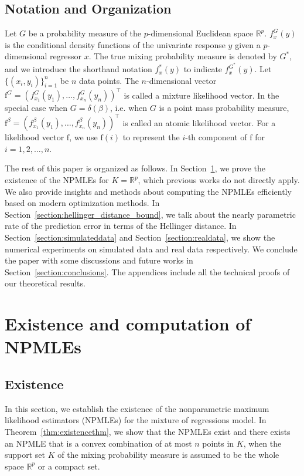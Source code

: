 \documentclass[11pt]{article}
\numberwithin{equation}{section}
\newcommand{\RS}{\mathbb{R}}
\newcommand{\T}{ \top }
\newcommand{\fv}{\mathrm{f}}
\begin{document}
\subsection{Notation and Organization}

 Let $G$ be a probability measure of the $p$-dimensional Euclidean space $\RS^p$. $f^G_{x}(y)$ is the conditional density functions of the univariate response $y$ given a $p$-dimensional regressor $x$. The true mixing probability measure is denoted by $G^*$, and we introduce the shorthand notation $f^*_x(y)$ to indicate $f^{G^*}_x(y)$. Let $\{(x_i,y_i)\}_{i=1}^n$ be $n$ data points. The $n$-dimensional vector $\fv^G = (f^G_{x_1}(y_1),\dots,f^G_{x_n}(y_n))^\T$ is called a mixture likelihood vector. In the special case when $G = \delta(\beta)$, i.e. when $G$ is a point mass probability measure,  $\fv^\beta = (f^\beta_{x_1}(y_1), \dots, f^\beta_{x_n}(y_n))^\T$ is called an atomic likelihood vector. For a likelihood vector $\fv$, we use $\fv (i)$ to represent the $i$-th component of $\fv$ for $i =1 ,2,\dots,n$.

The rest of this paper is organized as follows. In Section~\ref{section:existenceandcomputation}, we prove the existence of the NPMLEs for $K = \RS^p$, which previous works \citep{lindsay1983geometrya,bohning2000computer} do not directly apply. We also provide insights and methods about computing the NPMLEs efficiently based on modern optimization methods. In Section~\ref{section:hellinger_distance_bound}, we talk about the nearly parametric rate of the prediction error in terms of the Hellinger distance. In Section~\ref{section:simulateddata} and Section~\ref{section:realdata}, we show the numerical experiments on simulated data and real data respectively. We conclude the paper with some discussions and future works in Section~\ref{section:conclusions}. The appendices include all the technical proofs of our theoretical results.


\section{Existence and computation of NPMLEs}
\label{section:existenceandcomputation}

\subsection{Existence}
\label{subsection:existenceofnpmle}

In this section, we establish the existence of the nonparametric maximum likelihood estimators (NPMLEs) for the mixture of regressions model. In Theorem~\ref{thm:existencethm}, we show that the NPMLEs exist and there exists an NPMLE that is a convex combination of at most $n$ points in $K$, when the support set $K$ of the mixing probability measure is assumed to be the whole space $\RS^p$ or a compact set.
\end{document}
